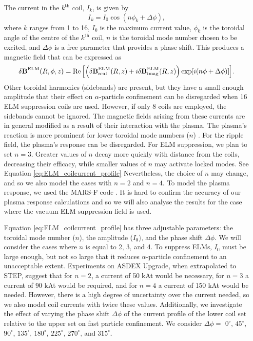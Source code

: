\documentclass[10pt, a4paper, twoside]{article}
\begin{document}
The current in the $k^\text{th}$ coil, $I_k$, is given by
\begin{equation}
    \label{eq:ELM_coilcurrent_profile}
    I_k = I_0 \cos(n \phi_k + \Delta \phi),
\end{equation}
where $k$ ranges from 1 to 16, $I_0$ is the maximum current value, $\phi_k$ is the toroidal angle of the centre of the $k^\text{th}$ coil, $n$ is the toroidal mode number chosen to be excited, and $\Delta \phi$ is a free parameter that provides a phase shift. This produces a magnetic field that can be expressed as
\begin{equation}
    \delta\textbf{B}^\text{ELM}(R, \phi, z)=\Re\qty[\qty(\delta\textbf{B}^\text{ELM}_\text{real}(R,z) + i\delta\textbf{B}^\text{ELM}_\text{imag}(R,z))\exp[i(n\phi + \Delta \phi)]].
\end{equation}
Other toroidal harmonics (sidebands) are present, but they have a small enough amplitude that their effect on $\alpha$-particle confinement can be disregarded when 16 ELM suppression coils are used. However, if only 8 coils are employed, the sidebands cannot be ignored. The magnetic fields arising from these currents are in general modified as a result of their interaction with the plasma. The plasma's reaction is more prominent for lower toroidal mode numbers ($n$) \cite{mcclements2005}. For the ripple field, the plasma's response can be disregarded. For ELM suppression, we plan to set $n=3$. Greater values of $n$ decay more quickly with distance from the coils, decreasing their efficacy, while smaller values of $n$ may activate locked modes. See Equation \eqref{eq:ELM_coilcurrent_profile} Nevertheless, the choice of $n$ may change, and so we also model the cases with $n=2$ and $n=4$. To model the plasma response, we used the MARS-F code \cite{liu2015}. It is hard to confirm the accuracy of our plasma response calculations and so we will also analyse the results for the case where the vacuum ELM suppression field is used.

Equation \ref{eq:ELM_coilcurrent_profile} has three adjustable parameters: the toroidal mode number ($n$), the amplitude ($I_0$), and the phase shift $\Delta \phi$. We will consider the cases where $n$ is equal to 2, 3, and 4. To suppress ELMs, $I_0$ must be large enough, but not so large that it reduces $\alpha$-particle confinement to an unacceptable extent. Experiments on ASDEX Upgrade, when extrapolated to STEP, suggest that for $n=2$, a current of 50 kAt would be necessary, for $n=3$ a current of 90 kAt would be required, and for $n=4$ a current of 150 kAt would be needed. However, there is a high degree of uncertainty over the current needed, so we also model coil currents with twice these values. Additionally, we investigate the effect of varying the phase shift $\Delta\phi$ of the current profile of the lower coil set relative to the upper set on fast particle confinement. We consider $\Delta\phi =$ $0^\circ$, $45^\circ$, $90^\circ$, $135^\circ$, $180^\circ$, $225^\circ$, $270^\circ$, and $315^\circ$.
\end{document}
